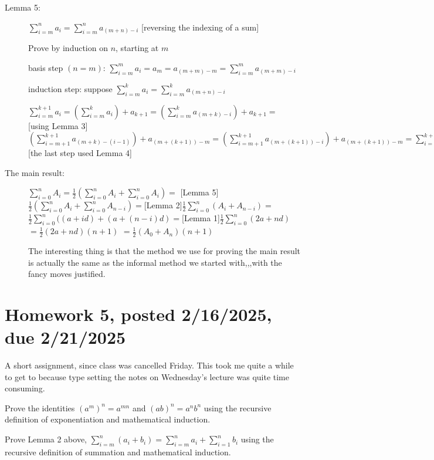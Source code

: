\documentclass[12pt]{article}
\begin{document}
\begin{description}
\item[Lemma 5:] $\sum_{i=m}^n a_i = \sum_{i=m}^n a_{(m+n)-i}$  [reversing the indexing of a sum]

Prove by induction on $n$, starting at $m$

basis step $(n=m)$:  $\sum_{i=m}^m a_i = a_m = a_{(m+m)-m} = \sum_{i=m}^m a_{(m+m)-i}$

induction step:  suppose $\sum_{i=m}^k a_i = \sum_{i=m}^k a_{(m+n)-i}$

$\sum_{i=m}^{k+1} a_i =(\sum_{i=m}^k a_i )+ a_{k+1} = (\sum_{i=m}^ka_{(m+k)-i}) + a_{k+1} =$ [using Lemma 3] $(\sum_{i=m+1}^{k+1}a_{(m+k)-(i-1)}) + a_{(m+(k+1))-m} = (\sum_{i=m+1}^{k+1}a_{(m+(k+1))-i}) + a_{(m+(k+1))-m} = \sum_{i=m}^{k+1}a_{(m+(k+1))-i}$ [the last step used Lemma 4]

\item[The main result:]  $\sum_{i=0}^n A_i = \frac12(\sum_{i=0}^n A_i + \sum_{i=0}^n A_i) = $ [Lemma 5]\newline$\frac12(\sum_{i=0}^n A_i + \sum_{i=0}^n A_{n-i}) = $[Lemma 2]$ \frac 12\sum_{i=0}^n(A_i+A_{n-i}) =$\newline$ \frac12\sum_{i=0}^n((a+id) + (a+(n-i)d) = $[Lemma 1]$\frac12 \sum_{i=0}^n(2a+nd) $\newline$= \frac12(2a+nd)(n+1) $ $= \frac12(A_0 + A_n)(n+1)$

The interesting thing is that the method we use for proving the main result is actually the same as the informal method we started with,,,with the fancy moves justified.



\end{description}

\section{Homework 5, posted 2/16/2025, due 2/21/2025}

A short assignment, since class was cancelled Friday.  This took me quite a while to get to because type setting the notes on Wednesday's lecture was quite time consuming.

Prove the identities $(a^m)^n=a^{mn}$ and $(ab)^n = a^nb^n$ using the recursive definition of exponentiation and mathematical induction.

Prove Lemma 2 above, $\sum_{i=m}^n (a_i + b_i) = \sum_{i=m}^n a_i + \sum_{i=1}^n b_i$ using the recursive definition of summation and mathematical induction.
\end{document}
